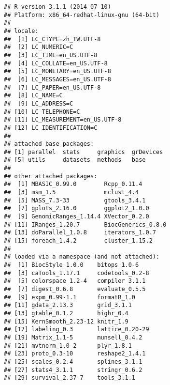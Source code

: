\documentclass[a4paper,10pt]{article}\usepackage[]{graphicx}\usepackage[]{color}
\makeatletter
\newenvironment{kframe}{%
 \def\at@end@of@kframe{}%
 \ifinner\ifhmode%
  \def\at@end@of@kframe{\end{minipage}}%
  \begin{minipage}{\columnwidth}%
 \fi\fi%
 \def\FrameCommand##1{\hskip\@totalleftmargin \hskip-\fboxsep
 \colorbox{shadecolor}{##1}\hskip-\fboxsep
     \hskip-\linewidth \hskip-\@totalleftmargin \hskip\columnwidth}%
 \MakeFramed {\advance\hsize-\width
   \@totalleftmargin\z@ \linewidth\hsize
   \@setminipage}}%
 {\par\unskip\endMakeFramed%
 \at@end@of@kframe}
\newenvironment{knitrout}{}{} %
\makeatother
\begin{document}
\begin{knitrout}
\color{fgcolor}\begin{kframe}
\begin{verbatim}
## R version 3.1.1 (2014-07-10)
## Platform: x86_64-redhat-linux-gnu (64-bit)
## 
## locale:
##  [1] LC_CTYPE=zh_TW.UTF-8      
##  [2] LC_NUMERIC=C              
##  [3] LC_TIME=en_US.UTF-8       
##  [4] LC_COLLATE=en_US.UTF-8    
##  [5] LC_MONETARY=en_US.UTF-8   
##  [6] LC_MESSAGES=en_US.UTF-8   
##  [7] LC_PAPER=en_US.UTF-8      
##  [8] LC_NAME=C                 
##  [9] LC_ADDRESS=C              
## [10] LC_TELEPHONE=C            
## [11] LC_MEASUREMENT=en_US.UTF-8
## [12] LC_IDENTIFICATION=C       
## 
## attached base packages:
## [1] parallel  stats     graphics  grDevices
## [5] utils     datasets  methods   base     
## 
## other attached packages:
##  [1] MBASIC_0.99.0        Rcpp_0.11.4         
##  [3] msm_1.5              mclust_4.4          
##  [5] MASS_7.3-33          gtools_3.4.1        
##  [7] gplots_2.16.0        ggplot2_1.0.0       
##  [9] GenomicRanges_1.14.4 XVector_0.2.0       
## [11] IRanges_1.20.7       BiocGenerics_0.8.0  
## [13] doParallel_1.0.8     iterators_1.0.7     
## [15] foreach_1.4.2        cluster_1.15.2      
## 
## loaded via a namespace (and not attached):
##  [1] BiocStyle_1.0.0    bitops_1.0-6      
##  [3] caTools_1.17.1     codetools_0.2-8   
##  [5] colorspace_1.2-4   compiler_3.1.1    
##  [7] digest_0.6.8       evaluate_0.5.5    
##  [9] expm_0.99-1.1      formatR_1.0       
## [11] gdata_2.13.3       grid_3.1.1        
## [13] gtable_0.1.2       highr_0.4         
## [15] KernSmooth_2.23-12 knitr_1.9         
## [17] labeling_0.3       lattice_0.20-29   
## [19] Matrix_1.1-5       munsell_0.4.2     
## [21] mvtnorm_1.0-2      plyr_1.8.1        
## [23] proto_0.3-10       reshape2_1.4.1    
## [25] scales_0.2.4       splines_3.1.1     
## [27] stats4_3.1.1       stringr_0.6.2     
## [29] survival_2.37-7    tools_3.1.1
\end{verbatim}
\end{kframe}
\end{knitrout}






\end{document}
